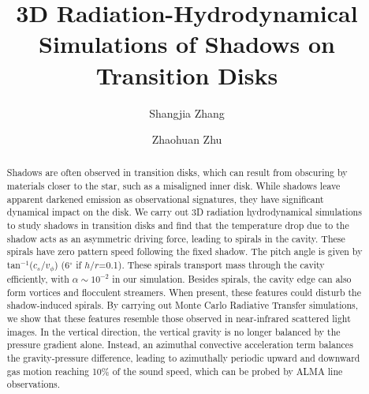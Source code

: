 \documentclass[twocolumn,tighten]{aastex631}
\begin{document}
\title{3D Radiation-Hydrodynamical Simulations of Shadows on Transition Disks}


\author[0000-0002-8537-9114]{Shangjia Zhang}


\author[0000-0003-3616-6822]{Zhaohuan Zhu}

\begin{abstract}
Shadows are often observed in transition disks, which can result from obscuring by materials closer to the star, such as a misaligned inner disk. While shadows leave apparent darkened emission as observational signatures, they have significant dynamical impact on the disk. We carry out 3D radiation hydrodynamical simulations to study shadows in transition disks and find that the temperature drop due to the shadow acts as an asymmetric driving force, leading to spirals in the cavity. These spirals have zero pattern speed following the fixed shadow. The pitch angle is given by tan$^{-1}$($c_s$/$v_\phi$) (6$^{\circ}$ if $h/r$=0.1). These spirals transport mass through the cavity efficiently, with $\alpha \sim 10^{-2}$ in our simulation. Besides spirals, the cavity edge can also form vortices and flocculent streamers. When present, these features could disturb the shadow-induced spirals. By carrying out Monte Carlo Radiative Transfer simulations, we show that these features resemble those observed in near-infrared scattered light images. In the vertical direction, the vertical gravity is no longer balanced by the pressure gradient alone. Instead, an azimuthal convective acceleration term balances the gravity-pressure difference, leading to azimuthally periodic upward and downward gas motion reaching 10\% of the sound speed, which can be probed by ALMA line observations.

\end{abstract}
\end{document}
